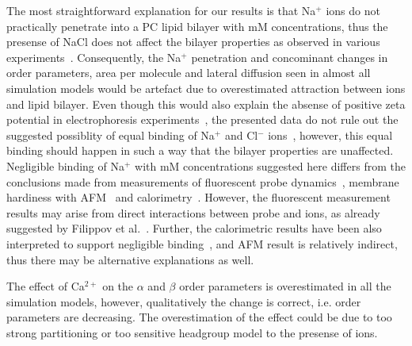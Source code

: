 \documentclass[pre,aps,floatfix,authordate1-4,twocolumn]{revtex4-1}
\begin{document}
The most straightforward explanation for our results is that Na$^+$ ions do not practically penetrate into a PC lipid bilayer
with mM concentrations, thus the presense of NaCl does not affect the bilayer properties as observed in various experiments~\cite{akutsu81,altenbach84,clarke99,binder02,pabst07,filippov09}.
Consequently, the Na$^+$ penetration and concominant changes in order parameters, area per molecule and lateral diffusion 
seen in almost all simulation models would be artefact due to overestimated attraction between ions and lipid bilayer.
Even though this would also explain the absense of positive zeta potential in electrophoresis experiments~\cite{eisenberg79,tatulian87,manyes05,manyes06,klasczyk10},  
the presented data do not rule out the suggested possiblity of equal binding of Na$^+$ and Cl$^-$ ions~\cite{knecht13},
however, this equal binding should happen in such a way that the bilayer properties are unaffected.
Negligible binding of Na$^+$ with mM concentrations suggested here differs from the conclusions made from 
measurements of fluorescent probe dynamics~\cite{bockmann03,vacha09a,harb13}, membrane hardiness with AFM~\cite{manyes05,manyes06,fukuma07,ferber11,morata12} and calorimetry~\cite{bockmann03,klasczyk10}.
However, the fluorescent measurement results may arise from direct interactions between probe and ions, as already suggested by Filippov et al.~\cite{filippov09}. 
Further, the calorimetric results have been also interpreted to support negligible binding~\cite{cevc90}, and AFM result is relatively indirect, thus
there may be alternative explanations as well.

The effect of Ca$^{2+}$ on the $\alpha$ and $\beta$ order parameters is overestimated in all the simulation models, however,
qualitatively the change is correct, i.e. order parameters are decreasing.
The overestimation of the effect could be due to too strong partitioning or too sensitive headgroup model to the presense of ions.
 \\
\end{document}
